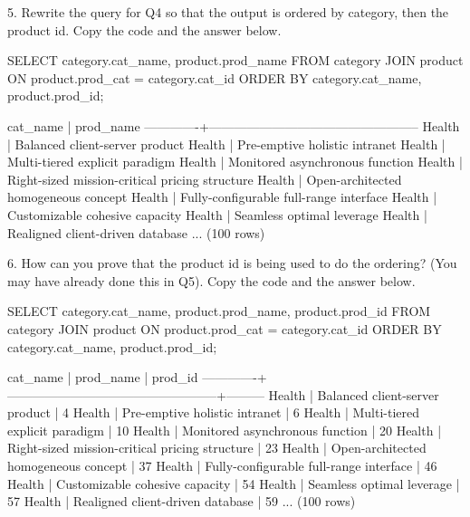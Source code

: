 5. Rewrite the query for Q4 so that the output is ordered by category, then the product id. Copy the code and the answer below.
\begin{sql}
SELECT category.cat_name, product.prod_name FROM category
JOIN product ON product.prod_cat = category.cat_id
ORDER BY category.cat_name, product.prod_id;
\end{sql}
\begin{pseudo*}
  cat_name   |                    prod_name
-------------+--------------------------------------------------
 Health      | Balanced client-server product
 Health      | Pre-emptive holistic intranet
 Health      | Multi-tiered explicit paradigm
 Health      | Monitored asynchronous function
 Health      | Right-sized mission-critical pricing structure
 Health      | Open-architected homogeneous concept
 Health      | Fully-configurable full-range interface
 Health      | Customizable cohesive capacity
 Health      | Seamless optimal leverage
 Health      | Realigned client-driven database
...
(100 rows)
\end{pseudo*}

6. How can you prove that the product id is being used to do the ordering? (You may have already done this in Q5). Copy the code and the answer below.
\begin{sql}
SELECT category.cat_name, product.prod_name, product.prod_id FROM category
JOIN product ON product.prod_cat = category.cat_id
ORDER BY category.cat_name, product.prod_id;
\end{sql}
\begin{pseudo*}
  cat_name   |                    prod_name                     | prod_id 
-------------+--------------------------------------------------+---------
 Health      | Balanced client-server product                   |       4
 Health      | Pre-emptive holistic intranet                    |       6
 Health      | Multi-tiered explicit paradigm                   |      10
 Health      | Monitored asynchronous function                  |      20
 Health      | Right-sized mission-critical pricing structure   |      23
 Health      | Open-architected homogeneous concept             |      37
 Health      | Fully-configurable full-range interface          |      46
 Health      | Customizable cohesive capacity                   |      54
 Health      | Seamless optimal leverage                        |      57
 Health      | Realigned client-driven database                 |      59
...
(100 rows)
\end{pseudo*}

